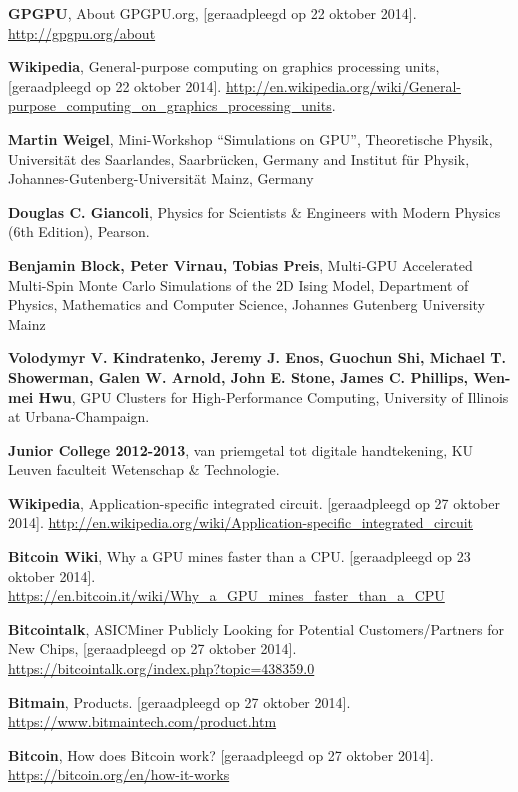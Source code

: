 \documentclass[11pt, a4paper]{article}
\begin{document}
\begin{thebibliography}{9}
	
	\textbf{GPGPU}, 
	About GPGPU.org, 
	[geraadpleegd op 22 oktober 2014]. 
	\url{http://gpgpu.org/about}

	\textbf{Wikipedia}, 
	General-purpose computing on graphics processing units, 
	[geraadpleegd op 22 oktober 2014]. 
	\url{http://en.wikipedia.org/wiki/General-purpose_computing_on_graphics_processing_units}.

	\textbf{Martin Weigel}, 
	Mini-Workshop “Simulations on GPU”, 
	Theoretische Physik, Universit\"at des Saarlandes, Saarbr\"ucken, Germany and Institut f\"ur Physik, Johannes-Gutenberg-Universit\"at Mainz, Germany

 	\textbf{Douglas C. Giancoli}, 
	Physics for Scientists \& Engineers with Modern Physics (6th Edition), 
	Pearson.

	\textbf{Benjamin Block, Peter Virnau, Tobias Preis}, 
	Multi-GPU Accelerated Multi-Spin Monte Carlo Simulations of the 2D Ising Model, 
	Department of Physics, Mathematics and Computer Science, Johannes Gutenberg University Mainz 
	
	\textbf{Volodymyr V. Kindratenko, Jeremy J. Enos, Guochun Shi, Michael T. Showerman, Galen W. Arnold, John E. Stone, James C. Phillips, Wen-mei Hwu}, 
	GPU Clusters for High-Performance Computing, 
	University of Illinois at Urbana-Champaign. 

	\textbf{Junior College 2012-2013}, 
	van priemgetal tot digitale handtekening, 
	KU Leuven faculteit Wetenschap \& Technologie.
	
	\textbf{Wikipedia}, 
	Application-specific integrated circuit. 
	[geraadpleegd op 27 oktober 2014]. 
	\url{http://en.wikipedia.org/wiki/Application-specific_integrated_circuit}
	
	\textbf{Bitcoin Wiki}, 
	Why a GPU mines faster than a CPU. 
	[geraadpleegd op 23 oktober 2014]. 
	\url{https://en.bitcoin.it/wiki/Why_a_GPU_mines_faster_than_a_CPU}

	\textbf{Bitcointalk}, 
	ASICMiner Publicly Looking for Potential Customers/Partners for New Chips,  
	[geraadpleegd op 27 oktober 2014]. 
	\url{https://bitcointalk.org/index.php?topic=438359.0}

	\textbf{Bitmain}, 
	Products. 
	[geraadpleegd op 27 oktober 2014]. 
	\url{https://www.bitmaintech.com/product.htm}	

	\textbf{Bitcoin}, 
	How does Bitcoin work? 
	[geraadpleegd op 27 oktober 2014]. 
	\url{https://bitcoin.org/en/how-it-works}
\end{thebibliography}
\end{document}
